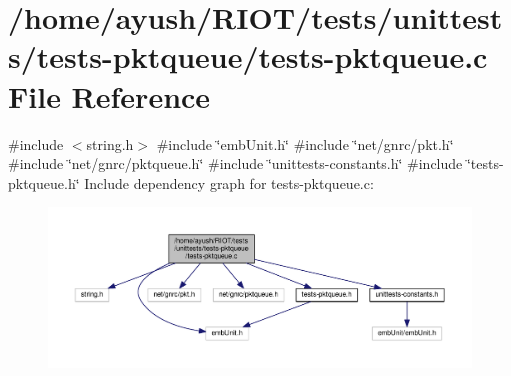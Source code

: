 \hypertarget{tests-pktqueue_8c}{}\section{/home/ayush/\+R\+I\+O\+T/tests/unittests/tests-\/pktqueue/tests-\/pktqueue.c File Reference}
\label{tests-pktqueue_8c}
{\ttfamily \#include $<$string.\+h$>$}\newline
{\ttfamily \#include \char`\"{}emb\+Unit.\+h\char`\"{}}\newline
{\ttfamily \#include \char`\"{}net/gnrc/pkt.\+h\char`\"{}}\newline
{\ttfamily \#include \char`\"{}net/gnrc/pktqueue.\+h\char`\"{}}\newline
{\ttfamily \#include \char`\"{}unittests-\/constants.\+h\char`\"{}}\newline
{\ttfamily \#include \char`\"{}tests-\/pktqueue.\+h\char`\"{}}\newline
Include dependency graph for tests-\/pktqueue.c\+:
\nopagebreak
\begin{figure}[H]
\begin{center}
\leavevmode
\includegraphics[width=350pt]{tests-pktqueue_8c__incl}
\end{center}
\end{figure}

